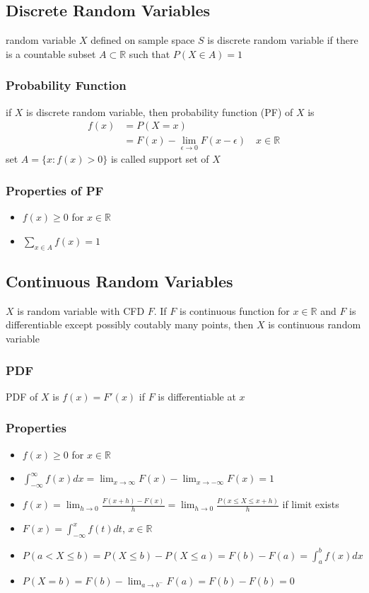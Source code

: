 \documentclass[11pt]{article}
\newcommand{\R}{{\mathbb{R}}}
\newcommand{\ds}{\displaystyle}
\begin{document}
\subsection{Discrete Random Variables}
random variable $X$ defined on sample space $S$ is discrete random variable if there is a countable subset $A\subset\R$ such that $P(X\in A)=1$
\subsubsection{Probability Function}
if $X$ is discrete random variable, then probability function (PF) of $X$ is 
\begin{align*}
    f(x) &= P(X=x) \\
         &= F(x) - \lim_{\epsilon\to0}F(x-\epsilon)\quad x\in\R 
\end{align*}
set $A=\{x:f(x)>0\}$ is called support set of $X$
\subsubsection{Properties of PF}
\begin{itemize}
    \item $f(x)\geq0$ for $x\in\R$
    \item $\ds\sum_{x\in A}f(x) = 1$
\end{itemize}
\subsection{Continuous Random Variables}
$X$ is random variable with CFD $F$. If $F$ is continuous function for $x\in\R$ and $F$ is differentiable except possibly coutably many points, then $X$ is continuous random variable
\subsubsection{PDF}
PDF of $X$ is $f(x) = F'(x)$ if $F$ is differentiable at $x$
\subsubsection{Properties}
\begin{itemize}
    \item $f(x)\geq0$ for $x\in\R$
    \item $\int_{-\infty}^{\infty}f(x)dx = \lim_{x\to\infty}F(x) - \lim_{x\to-\infty}F(x) = 1$
    \item $f(x)=\lim_{h\to0}\frac{F(x+h)-F(x)}{h}=\lim_{h\to0}\frac{P(x\leq X\leq x+h)}{h}$ if limit exists 
    \item $F(x)=\int_{-\infty}^{x}f(t)dt$, $x\in\R$
    \item $P(a<X\leq b)=P(X\leq b)-P(X\leq a) = F(b) - F(a)=\int_{a}^{b}f(x)dx$
    \item $P(X=b)=F(b)-\lim_{a\to b^-}F(a)=F(b)-F(b)=0$
\end{itemize}
\end{document}
